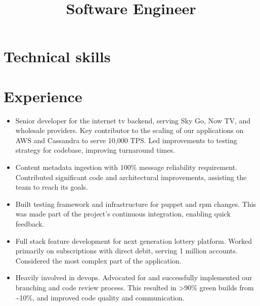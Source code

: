 \documentclass[11pt,a4paper,roman]{moderncv}
\title{Software Engineer}
\begin{document}
\makecvtitle

\section{Technical skills}

\section{Experience}

\begin{itemize}
\item Senior developer for the internet tv backend, serving Sky Go, Now TV, and wholesale providers. Key contributor to the scaling of our applications on AWS and Cassandra to serve 10,000 TPS. Led improvements to testing strategy for codebase, improving turnaround times.\newline
\item Content metadata ingestion with 100\% message reliability requirement. Contributed significant code and architectural improvements, assisting the team to reach its goals.\newline
\item Built testing framework and infrastructure for puppet and rpm changes. This was made part of the project's continuous integration, enabling quick feedback.\newline
\end{itemize}

\vspace{5mm}

\begin{itemize}
\item Full stack feature development for next generation lottery platform. Worked primarily on subscriptions with direct debit, serving 1 million accounts. Considered the most complex part of the application.\newline
\item Heavily involved in devops. Advocated for and successfully implemented our branching and code review process. This resulted in >90\% green builds from \textasciitilde10\%, and improved code quality and communication.\newline
\end{itemize}
\end{document}
